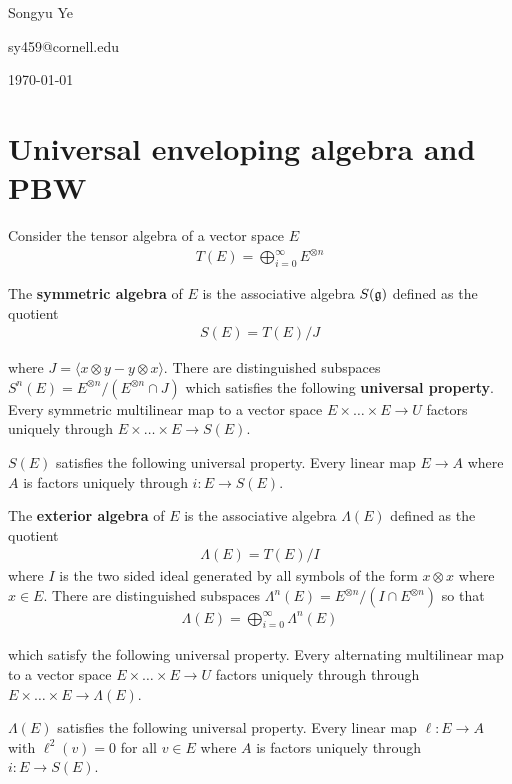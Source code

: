 \documentclass[12pt]{article}
\begin{document}
Songyu Ye 

sy459@cornell.edu

\today
\section{Universal enveloping algebra and PBW}
Consider the tensor algebra of a vector space $E$ \begin{align*}
    T(E) = \bigoplus_{i=0}^\infty E^{\otimes n} 
\end{align*}

\begin{definition}
The \textbf{symmetric algebra} of $E$ is the associative algebra $S(\mathfrak{g})$ defined as the quotient \begin{align*}
    S(E) = T(E) / J
\end{align*} 
\end{definition}
where $J = \langle x\otimes y - y\otimes x\rangle$. There are distinguished subspaces $S^n(E) = E^{\otimes n} / (E^{\otimes n} \cap J)$ which satisfies the following \textbf{universal property}. Every symmetric multilinear map to a vector space $E\times \dots \times E\to U$ factors uniquely through $E\times\dots \times E\to S(E)$.

\hfill

$S(E)$ satisfies the following universal property. Every linear map $E\to A$ where $A$ is  factors uniquely through $i:E\to S(E)$.

\begin{definition}
The \textbf{exterior algebra} of $E$ is the associative algebra $\Lambda(E)$ defined as the quotient \begin{align*}
    \Lambda(E) = T(E) / I
\end{align*} where $I$ is the two sided ideal generated by all symbols of the form $x\otimes x$ where $x\in E$. There are distinguished subspaces $\Lambda^n(E) = E^{\otimes n} / (I\cap E^{\otimes n})$ so that \begin{align*}
    \Lambda(E) = \bigoplus_{i=0}^\infty \Lambda^n(E)
\end{align*}
\end{definition} which satisfy the following universal property. Every alternating multilinear map to a vector space $E\times \dots \times E \to U$ factors uniquely through through $E\times\dots \times E\to \Lambda(E)$.

\hfill 

$\Lambda(E)$ satisfies the following universal property. Every linear map $\ell: E\to A$ with $\ell^2(v) = 0$ for all $v\in E$ where $A$ is  factors uniquely through $i:E\to S(E)$.
\end{document}

